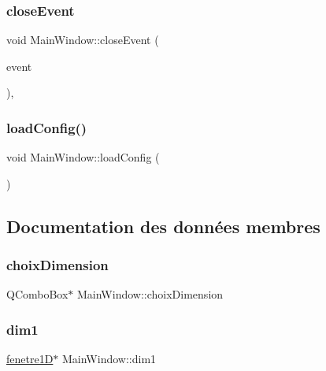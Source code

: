 \subsubsection{\texorpdfstring{close\+Event}{closeEvent}}
{\footnotesize\ttfamily void Main\+Window\+::close\+Event (\begin{DoxyParamCaption}\item[{Q\+Close\+Event $\ast$}]{event }\end{DoxyParamCaption})\hspace{0.3cm}{\ttfamily [override]}, {\ttfamily [slot]}}

\mbox{\label{class_main_window_a2a947444fcfc921b5d237c706024891d}} 
\subsubsection{\texorpdfstring{load\+Config()}{loadConfig()}}
{\footnotesize\ttfamily void Main\+Window\+::load\+Config (\begin{DoxyParamCaption}{ }\end{DoxyParamCaption})\hspace{0.3cm}{\ttfamily [private]}}



\subsection{Documentation des données membres}
\mbox{\label{class_main_window_a59a7033b41202d13e3d8a45691013147}} 
\subsubsection{\texorpdfstring{choix\+Dimension}{choixDimension}}
{\footnotesize\ttfamily Q\+Combo\+Box$\ast$ Main\+Window\+::choix\+Dimension\hspace{0.3cm}{\ttfamily [private]}}

\mbox{\label{class_main_window_a3729498370a4a7be9c5b4dad71dbe954}} 
\subsubsection{\texorpdfstring{dim1}{dim1}}
{\footnotesize\ttfamily \mbox{\hyperlink{classfenetre1_d}{fenetre1D}}$\ast$ Main\+Window\+::dim1\hspace{0.3cm}{\ttfamily [private]}}

